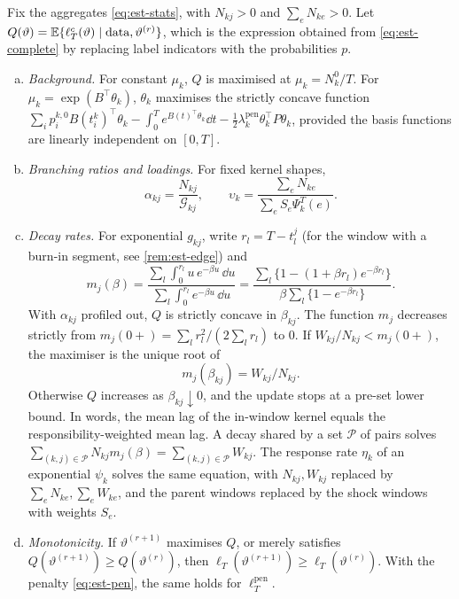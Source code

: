 \begin{proposition}[M-step]\label{prop:est-mstep}
Fix the aggregates \eqref{eq:est-stats}, with $N_{kj}>0$ and $\sum_eN_{ke}>0$. Let
$Q(\vartheta)=\mathbb{E}\{\ell^c_T(\vartheta)\mid\text{data},\vartheta^{(r)}\}$, which is the
expression obtained from \eqref{eq:est-complete} by replacing label indicators with the
probabilities $p$.
\begin{enumerate}[(a)]
  \item \emph{Background.} For constant $\mu_k$, $Q$ is maximised at $\mu_k=N^0_k/T$. For
    $\mu_k=\exp(B^{\top}\theta_k)$, $\theta_k$ maximises the strictly concave function
    $\sum_ip^{k,0}_iB(t^k_i)^{\top}\theta_k-\int_0^Te^{B(t)^{\top}\theta_k}\dd t
    -\tfrac12\lambda^{\mathrm{pen}}_k\theta_k^{\top}P\theta_k$, provided the basis
    functions are linearly independent on $[0,T]$.
  \item \emph{Branching ratios and loadings.} For fixed kernel shapes,
    \[
      \alpha_{kj}=\frac{N_{kj}}{\mathcal G_{kj}},\qquad
      \upsilon_k=\frac{\sum_eN_{ke}}{\sum_eS_e\Psi^T_k(e)} .
    \]
  \item \emph{Decay rates.} For exponential $g_{kj}$, write $r_l=T-t^j_l$ (for the window
    with a burn-in segment, see \cref{rem:est-edge}) and
    \[
      m_j(\beta)=\frac{\sum_l\int_0^{r_l}u\,e^{-\beta u}\,\dd u}{\sum_l\int_0^{r_l}e^{-\beta u}\,\dd u}
      =\frac{\sum_l\{1-(1+\beta r_l)e^{-\beta r_l}\}}{\beta\sum_l\{1-e^{-\beta r_l}\}} .
    \]
    With $\alpha_{kj}$ profiled out, $Q$ is strictly concave in $\beta_{kj}$. The function
    $m_j$ decreases strictly from $m_j(0+)=\sum_lr_l^2/(2\sum_lr_l)$ to $0$. If
    $W_{kj}/N_{kj}<m_j(0+)$, the maximiser is the unique root of
    \[
      m_j(\beta_{kj})=W_{kj}/N_{kj}.
    \]
    Otherwise $Q$ increases as $\beta_{kj}\downarrow0$, and the update stops at a
    pre-set lower bound. In words, the mean lag of the in-window kernel equals the
    responsibility-weighted mean lag. A decay shared by a set $\mathcal P$ of pairs solves
    $\sum_{(k,j)\in\mathcal P}N_{kj}m_j(\beta)=\sum_{(k,j)\in\mathcal P}W_{kj}$. The response
    rate $\eta_k$ of an exponential $\psi_k$ solves the same equation, with $N_{kj},W_{kj}$
    replaced by $\sum_eN_{ke},\sum_eW_{ke}$, and the parent windows replaced by the shock
    windows with weights $S_e$.
  \item \emph{Monotonicity.} If $\vartheta^{(r+1)}$ maximises $Q$, or merely satisfies
    $Q(\vartheta^{(r+1)})\ge Q(\vartheta^{(r)})$, then
    $\ell_T(\vartheta^{(r+1)})\ge\ell_T(\vartheta^{(r)})$. With the penalty
    \eqref{eq:est-pen}, the same holds for $\ell^{\mathrm{pen}}_T$.
\end{enumerate}
\end{proposition}

